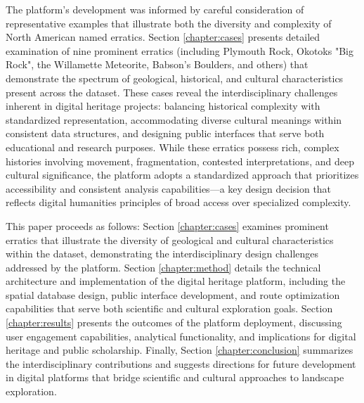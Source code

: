 The platform's development was informed by careful consideration of representative examples that illustrate both the diversity and complexity of North American named erratics. Section \ref{chapter:cases} presents detailed examination of nine prominent erratics (including Plymouth Rock, Okotoks "Big Rock", the Willamette Meteorite, Babson's Boulders, and others) that demonstrate the spectrum of geological, historical, and cultural characteristics present across the dataset. These cases reveal the interdisciplinary challenges inherent in digital heritage projects: balancing historical complexity with standardized representation, accommodating diverse cultural meanings within consistent data structures, and designing public interfaces that serve both educational and research purposes. While these erratics possess rich, complex histories involving movement, fragmentation, contested interpretations, and deep cultural significance, the platform adopts a standardized approach that prioritizes accessibility and consistent analysis capabilities—a key design decision that reflects digital humanities principles of broad access over specialized complexity.

This paper proceeds as follows: Section \ref{chapter:cases} examines prominent erratics that illustrate the diversity of geological and cultural characteristics within the dataset, demonstrating the interdisciplinary design challenges addressed by the platform. Section \ref{chapter:method} details the technical architecture and implementation of the digital heritage platform, including the spatial database design, public interface development, and route optimization capabilities that serve both scientific and cultural exploration goals. Section \ref{chapter:results} presents the outcomes of the platform deployment, discussing user engagement capabilities, analytical functionality, and implications for digital heritage and public scholarship. Finally, Section \ref{chapter:conclusion} summarizes the interdisciplinary contributions and suggests directions for future development in digital platforms that bridge scientific and cultural approaches to landscape exploration.

